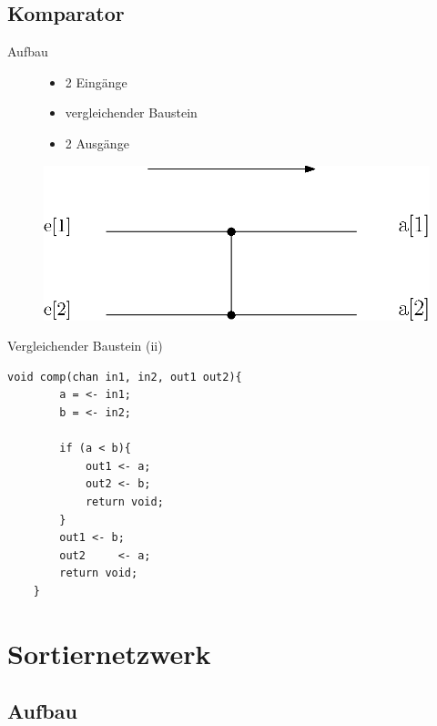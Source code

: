 \documentclass[ucs,9pt]{beamer}
\begin{document}
\subsection{Komparator}
\begin{frame}{Aufbau}
    \begin{figure}
		\begin{minipage}[l]{7cm}
        		\begin{itemize}
            		\item 2 Eingänge
	            \item vergleichender Baustein
    		        \item 2 Ausgänge
        		\end{itemize}
	    \end{minipage}
    		\hfill
		\begin{minipage}[r]{10cm}
			\includegraphics[scale=0.5]{Komparator1.eps}
	 	\end{minipage}
    \end{figure}	
\end{frame}

\begin{frame}[fragile]{Vergleichender Baustein (ii)}
\begin{lstlisting}[laguage={inform},tabsize=4]
    void comp(chan in1, in2, out1 out2){
        a = <- in1;
        b = <- in2;
        
        if (a < b){
            out1 <- a;
            out2 <- b;
            return void;
        }
        out1 <- b;
        out2	 <- a;
        return void;
    }
\end{lstlisting}
\end{frame}

\section{Sortiernetzwerk}
\subsection{Aufbau}
\end{document}
